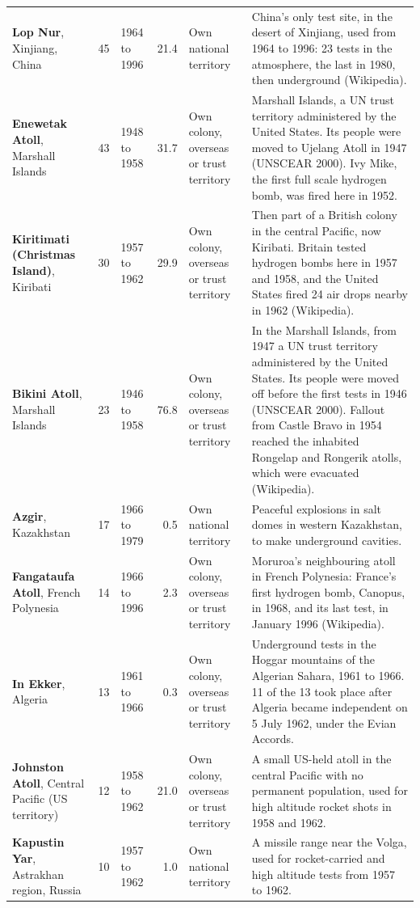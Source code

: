 \documentclass[11pt,a4paper]{article}
\begin{document}
{\begin{longtable}{p{3.3cm}rp{1.2cm}rp{2.2cm}p{5.6cm}}
\textbf{Lop Nur}, Xinjiang, China & 45 & 1964 to 1996 & 21.4 & Own national territory & China's only test site, in the desert of Xinjiang, used from 1964 to 1996: 23 tests in the atmosphere, the last in 1980, then underground (Wikipedia).\\
\textbf{Enewetak Atoll}, Marshall Islands & 43 & 1948 to 1958 & 31.7 & Own colony, overseas or trust territory & Marshall Islands, a UN trust territory administered by the United States. Its people were moved to Ujelang Atoll in 1947 (UNSCEAR 2000). Ivy Mike, the first full scale hydrogen bomb, was fired here in 1952.\\
\textbf{Kiritimati (Christmas Island)}, Kiribati & 30 & 1957 to 1962 & 29.9 & Own colony, overseas or trust territory & Then part of a British colony in the central Pacific, now Kiribati. Britain tested hydrogen bombs here in 1957 and 1958, and the United States fired 24 air drops nearby in 1962 (Wikipedia).\\
\textbf{Bikini Atoll}, Marshall Islands & 23 & 1946 to 1958 & 76.8 & Own colony, overseas or trust territory & In the Marshall Islands, from 1947 a UN trust territory administered by the United States. Its people were moved off before the first tests in 1946 (UNSCEAR 2000). Fallout from Castle Bravo in 1954 reached the inhabited Rongelap and Rongerik atolls, which were evacuated (Wikipedia).\\
\textbf{Azgir}, Kazakhstan & 17 & 1966 to 1979 & 0.5 & Own national territory & Peaceful explosions in salt domes in western Kazakhstan, to make underground cavities.\\
\textbf{Fangataufa Atoll}, French Polynesia & 14 & 1966 to 1996 & 2.3 & Own colony, overseas or trust territory & Moruroa's neighbouring atoll in French Polynesia: France's first hydrogen bomb, Canopus, in 1968, and its last test, in January 1996 (Wikipedia).\\
\textbf{In Ekker}, Algeria & 13 & 1961 to 1966 & 0.3 & Own colony, overseas or trust territory & Underground tests in the Hoggar mountains of the Algerian Sahara, 1961 to 1966. 11 of the 13 took place after Algeria became independent on 5 July 1962, under the Evian Accords.\\
\textbf{Johnston Atoll}, Central Pacific (US territory) & 12 & 1958 to 1962 & 21.0 & Own colony, overseas or trust territory & A small US-held atoll in the central Pacific with no permanent population, used for high altitude rocket shots in 1958 and 1962.\\
\textbf{Kapustin Yar}, Astrakhan region, Russia & 10 & 1957 to 1962 & 1.0 & Own national territory & A missile range near the Volga, used for rocket-carried and high altitude tests from 1957 to 1962.\\

\end{longtable}}
\end{document}
